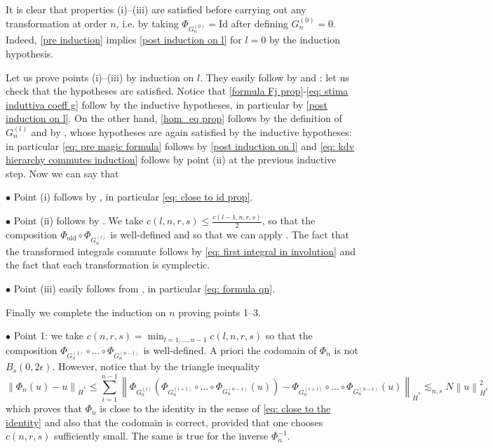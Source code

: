 \documentclass[a4paper,10pt,reqno]{article}
\theoremstyle{definition}
\theoremstyle{plain}
\theoremstyle{plain}
\theoremstyle{definition}
\theoremstyle{plain}
\theoremstyle{plain}
\theoremstyle{plain}
\theoremstyle{definition}
\theoremstyle{definition}
\newcommand{\norm}[1]{\left\lVert #1 \right\rVert}
\begin{document}
It is clear that properties (i)--(iii) are satisfied before carrying out any transformation at order $n$, i.e. by taking $\Phi_{G_n^{(0)}}=\mbox{Id}$ after defining $G_n^{(0)}=0$.
Indeed, \eqref{pre induction} implies \eqref{post induction on l} for $l=0$ by the induction hypothesis. 

\medskip

Let us prove points (i)--(iii) by induction on $l$. 
They easily follow by  and : let us check that the hypotheses are satisfied.
Notice that \eqref{formula Fj prop}-\eqref{eq: stima induttiva coeff g} follow by the inductive hypotheses, in particular by \eqref{post induction on l}.
On the other hand, \eqref{hom_eq prop} follows by the definition of $G_n^{(l)}$ and by , whose hypotheses are again satisfied by the inductive hypotheses: in particular \eqref{eq: pre magic formula} follows by \eqref{post induction on l} and \eqref{eq: kdv hierarchy commutes induction} follows by point (ii) at the previous inductive step.
Now we can say that

\smallskip

\noindent $\bullet$ Point (i) follows by , in particular \eqref{eq: close to id prop}.  

\noindent $\bullet$ Point (ii) follows by .
We take $c(l,n,r,s) \leq \frac{c(l-1,n,r,s)}{2}$, so that the composition $\Phi_{\mathrm{old}} \circ \Phi_{G_n^{(l)}}$ is well-defined and so that we can apply .
The fact that the transformed integrals commute follows by \eqref{eq: first integral in involution} and the fact that each transformation is symplectic.


\noindent $\bullet$ Point (iii) easily follows from , in particular \eqref{eq: formula qn}.

\medskip

Finally we complete the induction on $n$ proving points 1--3.

\smallskip

\noindent $\bullet$ Point 1: we take $c(n,r,s)=\min_{l=1,...,n-1} c(l,n,r,s)$ so that the composition $\Phi_{G_n^{(1)}} \circ \ldots \circ \Phi_{G_n^{(n-1)}}$ is well-defined.
A priori the codomain of $\Phi_n$ is not $B_s(0,2\epsilon)$.
However, notice that by the triangle inequality
\begin{equation} \label{real codomain}
\norm{\Phi_n(u)-u}_{\dot{H}^s} \le \sum_{i=1}^{n-1} \norm{\Phi_{G_n^{(i)}} \left ( \Phi_{G_n^{(i+1)}} \circ \ldots \circ \Phi_{G_n^{(n-1)}}(u) \right )  - \Phi_{G_n^{(i+1)}} \circ \ldots \circ \Phi_{G_n^{(n-1)}}(u)}_{\dot{H}^s} \lesssim_{n,s} N \norm{u}_{\dot{H}^s}^2
\end{equation}
which proves that $\Phi_n$ is close to the identity in the sense of \eqref{eq: close to the identity} and also that the codomain is correct, provided that one chooses $c(n,r,s)$ sufficiently small.
The same is true for the inverse $\Phi_n^{-1}$.
\end{document}
